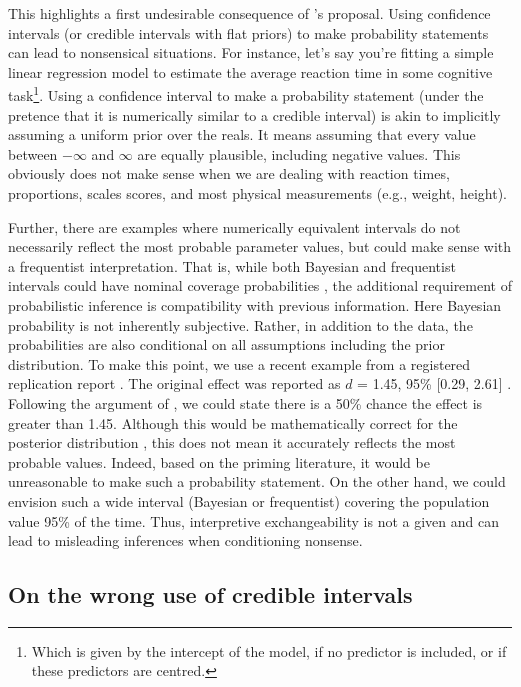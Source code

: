 \documentclass[a4paper,man,natbib,floatsintext,donotrepeattitle]{apa6}
\begin{document}
 This highlights a first undesirable consequence of \cite{albers_credible_2018}'s proposal. Using confidence intervals (or credible intervals with flat priors) to make probability statements can lead to nonsensical situations. For instance, let's say you're fitting a simple linear regression model to estimate the average reaction time in some cognitive task\footnote{Which is given by the intercept of the model, if no predictor is included, or if these predictors are centred.}. Using a confidence interval to make a probability statement (under the pretence that it is numerically similar to a credible interval) is akin to implicitly assuming a uniform prior over the reals. It means assuming that every value between $-\infty$ and $\infty$ are equally plausible, including negative values. This obviously does not make sense when we are dealing with reaction times, proportions, scales scores, and most physical measurements (e.g., weight, height).
 
 Further, there are examples where numerically equivalent intervals do not necessarily reflect the most probable parameter values, but could make sense with a frequentist interpretation. That is, while both Bayesian and frequentist intervals could have nominal coverage probabilities \citep{albers_credible_2018}, the additional requirement of probabilistic inference is compatibility with previous information. Here Bayesian probability is not inherently subjective. Rather, in addition to the data, the probabilities are also conditional on all assumptions including the prior distribution. To make this point, we use a recent example from a registered replication report \citep{verschuere_registered_2018}. The original effect was reported as $d$ = 1.45, 95\% [0.29, 2.61] \citep{mazar_dishonesty_2008}. Following the argument of \cite{albers_credible_2018}, we could state there is a 50\% chance the effect is greater than 1.45. Although this would be mathematically correct for the posterior distribution \citep{gelman_p_2013}, this does not mean it accurately reflects the most probable values. Indeed, based on the priming literature, it would be unreasonable to make such a probability statement. On the other hand, we could envision such a wide interval (Bayesian or frequentist) covering the population value 95\% of the time. Thus, interpretive exchangeability is not a given and can lead to misleading inferences when conditioning nonsense.

\subsection{On the wrong use of credible intervals}
\end{document}
